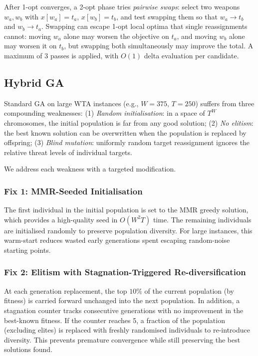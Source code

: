 \documentclass[10pt,conference]{IEEEtran}
\begin{document}
After 1-opt converges, a 2-opt phase tries \emph{pairwise swaps}: select two
weapons $w_a, w_b$ with $x[w_a] = t_a$, $x[w_b] = t_b$, and test swapping
them so that $w_a \to t_b$ and $w_b \to t_a$.  Swapping can escape 1-opt
local optima that single reassignments cannot: moving $w_a$ alone may worsen
the objective on $t_a$, and moving $w_b$ alone may worsen it on $t_b$, but
swapping both simultaneously may improve the total.
A maximum of 3 passes is applied, with $O(1)$ delta evaluation per candidate.

\subsection{Hybrid GA}
\label{sec:hybridga}

Standard GA on large WTA instances (e.g., $W=375$, $T=250$) suffers from
three compounding weaknesses:
(1) \emph{Random initialisation}: in a space of $T^W$ chromosomes, the initial
population is far from any good solution;
(2) \emph{No elitism}: the best known solution can be overwritten when the
population is replaced by offspring;
(3) \emph{Blind mutation}: uniformly random target reassignment ignores the
relative threat levels of individual targets.

We address each weakness with a targeted modification.

\subsubsection{Fix 1: MMR-Seeded Initialisation}

The first individual in the initial population is set to the MMR greedy
solution, which provides a high-quality seed in $O(W^2T)$ time.  The remaining individuals
are initialised randomly to preserve population diversity.  For large instances,
this warm-start reduces wasted early generations spent escaping random-noise
starting points.

\subsubsection{Fix 2: Elitism with Stagnation-Triggered Re-diversification}

At each generation replacement, the top $10\%$ of the current population
(by fitness) is carried forward unchanged into the next population.  In
addition, a stagnation counter tracks consecutive generations with no
improvement in the best-known fitness.  If the counter reaches 5, a fraction
of the population (excluding elites) is replaced with freshly randomised
individuals to re-introduce diversity.  This prevents premature convergence
while still preserving the best solutions found.
\end{document}
